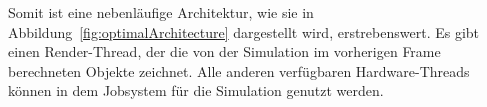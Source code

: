 Somit ist eine nebenläufige Architektur, wie sie in Abbildung~\ref{fig:optimalArchitecture} dargestellt wird, erstrebenswert. Es gibt einen Render-Thread, der die von der Simulation im vorherigen Frame berechneten Objekte zeichnet. Alle anderen verfügbaren Hardware-Threads können in dem Jobsystem für die Simulation genutzt werden.